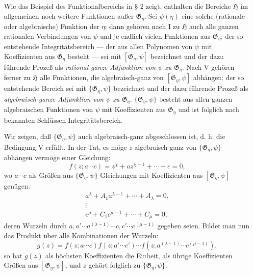 Wie das Beispiel des Funktionalbereichs in § 2 zeigt, enthalten die Bereiche
$\mathfrak H$ im allgemeinen noch weitere Funktionen außer $\mathfrak G_\eta$.
Sei $\psi(\eta)$ eine solche (rationale oder algebraische) Funktion der $\eta$;
dann gehören nach I zu $\mathfrak H$ auch alle ganzen rationalen Verbindungen
von $\psi$ und je endlich vielen Funktionen aus $\mathfrak G_\eta$; der so
entstehende Integritätsbereich --- der aus allen Polynomen von $\psi$ mit
Koeffizienten aus $\mathfrak G_\eta$ besteht --- sei mit $[\mathfrak G_\eta,\psi]$
bezeichnet und der dazu führende Prozeß als \glqq{}\emph{rational-ganze Adjunktion
von $\psi$ zu $\mathfrak G_\eta$}\grqq{}. Nach V gehören ferner zu $\mathfrak H$ alle
Funktionen, die algebraisch-ganz von $[\mathfrak G_\eta,\psi]$ abhängen; der so
entstehende Bereich sei mit $\{\mathfrak G_\eta,\psi\}$ bezeichnet und der dazu
führende Prozeß als \glqq{}\emph{algebraisch-ganze Adjunktion von $\psi$ zu
$\mathfrak G_\eta$}\grqq{}. $\{\mathfrak G_\eta,\psi\}$ besteht aus allen ganzen
algebraischen Funktionen von $\psi$ mit Koeffizienten aus $\mathfrak G_\eta$ und
ist folglich nach bekannten Schlüssen
Integritätsbereich.

Wir zeigen, daß $\{\mathfrak G_\eta,\psi\}$ auch algebraisch-ganz abgeschlossen
ist, d. h. die Bedingung V erfüllt. In der Tat, es möge $z$ algebraisch-ganz von
$\{\mathfrak G_\eta,\psi\}$ abhängen vermöge einer Gleichung:
\[
 f(z;a\cdots c)=z^\chi+a z^{\chi-1}+\cdots+c=0,
\]
wo $a\cdots c$ als Größen aus $\{\mathfrak G_\eta,\psi\}$ Gleichungen mit
Koeffizienten aus $[\mathfrak G_\eta,\psi]$ genügen:
\[
\begin{gathered}
 a^\lambda+A_1a^{\lambda-1}+\cdots+A_\lambda=0,\\
 \vdots\\
 c^\mu+C_1c^{\mu-1}+\cdots+C_\mu=0,
\end{gathered}
\]
deren Wurzeln durch $a,a'\cdots a^{(\lambda-1)}\cdots c,c'\cdots c^{(\mu-1)}$
gegeben seien. Bildet man nun das Produkt über alle Kombinationen der Wurzeln:
\[
 g(z)=f(z;a\cdots c)f(z;a'\cdots c')\cdots
      f(z;a^{(\lambda-1)}\cdots c^{(\mu-1)}),
\]
so hat $g(z)$ als höchsten Koeffizienten die Einheit, als übrige Koeffizienten
Größen aus $[\mathfrak G_\eta,\psi]$, und $z$ gehört folglich zu
$\{\mathfrak G_\eta,\psi\}$.

